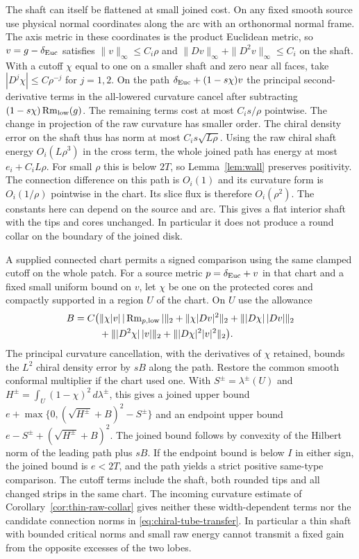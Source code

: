 The shaft can itself be flattened at small joined cost.
On any fixed smooth source use physical normal coordinates
along the arc with an orthonormal normal frame. The axis metric
in these coordinates is the product Euclidean metric, so
\(v=g-\delta_{\rm Euc}\) satisfies \(\|v\|_\infty\le C_i\rho\) and
\(\|Dv\|_\infty+\|D^2v\|_\infty\le C_i\) on the shaft.
With a cutoff \(\chi\) equal to one on a smaller shaft and zero
near all faces, take \(|D^j\chi|\le C\rho^{-j}\) for \(j=1,2\).
On the path \(\delta_{\rm Euc}+(1-s\chi)v\) the principal second-derivative
terms in the all-lowered curvature cancel after subtracting
\((1-s\chi)\operatorname{Rm}_{\rm low}(g)\). The remaining terms cost at
most \(C_i s/\rho\) pointwise. The change in projection of the
raw curvature has smaller order. The chiral density error on
the shaft thus has norm at most \(C_i s\sqrt{L\rho}\).
Using the raw chiral shaft energy \(O_i(L\rho^3)\) in the cross
term, the whole joined path has energy at most \(e_i+C_iL\rho\).
For small \(\rho\) this is below \(2T\), so
Lemma~\ref{lem:wall} preserves positivity. The connection difference
on this path is \(O_i(1)\) and its curvature form is \(O_i(1/\rho)\)
pointwise in the chart. Its slice flux is therefore \(O_i(\rho^2)\).
The constants here can depend on the source and arc. This gives a
flat interior shaft with the tips and cores unchanged.
In particular it does not produce a round collar on the
boundary of the joined disk.

A supplied connected chart permits a signed comparison using the
same clamped cutoff on the whole patch. For a source metric
\(p=\delta_{\rm Euc}+v\) in that chart and a fixed small uniform bound on \(v\),
let \(\chi\) be one on the protected cores and compactly supported
in a region \(U\) of the chart. On \(U\) use the allowance
\[
 \begin{aligned}
 B=C\big(&\|\chi |v|\,|\operatorname{Rm}_{p,\rm low}|\|_2
       +\|\chi |Dv|^2\|_2+\||D\chi|\,|Dv|\|_2\\
       &+\||D^2\chi|\,|v|\|_2+\||D\chi|^2 |v|^2\|_2\big).
 \end{aligned}
\]
The principal curvature cancellation, with the derivatives of
\(\chi\) retained, bounds the \(L^2\) chiral density error by \(sB\)
along the path. Restore the common smooth conformal multiplier
if the chart used one. With
\(S^\pm=\lambda^\pm(U)\) and
\(H^\pm=\int_U(1-\chi)^2\,d\lambda^\pm\), this gives a joined
upper bound \(e+\max\{0,(\sqrt{H^\pm}+B)^2-S^\pm\}\) and an
endpoint upper bound \(e-S^\pm+(\sqrt{H^\pm}+B)^2\).
The joined bound follows by convexity of the Hilbert norm of the
leading path plus \(sB\). If the endpoint bound is below \(I\)
in either sign, the joined bound is \(e<2T\), and the path
yields a strict positive same-type comparison.
The cutoff terms include the shaft, both rounded tips and all
changed strips in the same chart. The incoming curvature
estimate of Corollary~\ref{cor:thin-raw-collar} gives neither
these width-dependent terms nor the candidate connection norms
in \eqref{eq:chiral-tube-transfer}. In particular a thin shaft
with bounded critical norms and small raw energy cannot transmit
a fixed gain from the opposite excesses of the two lobes.
